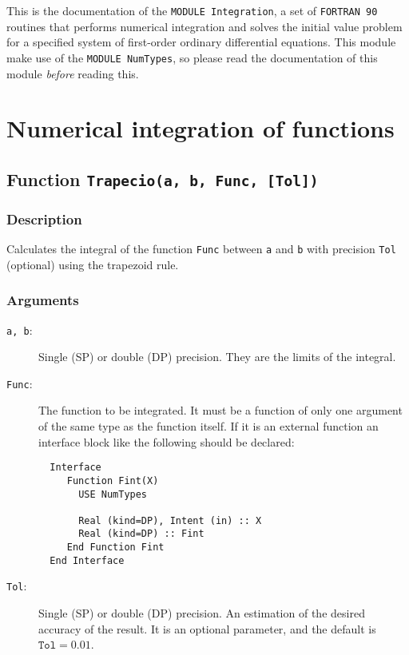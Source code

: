This is the documentation of the \texttt{MODULE Integration}, a set
of \texttt{FORTRAN 90} routines that performs numerical integration
and solves the initial value problem for a specified system  of
first-order  ordinary  differential equations. This module make use
of the \texttt{MODULE NumTypes}, so please read the documentation of
this module \emph{before} reading this.

\section{Numerical integration of functions}


\subsection{Function \texttt{Trapecio(a, b, Func, [Tol])}}

\subsubsection{Description}

Calculates the integral of the function \texttt{Func} between
\texttt{a} and \texttt{b} with precision \texttt{Tol} (optional) using
the trapezoid rule.


\subsubsection{Arguments}

\begin{description}
\item[\texttt{a, b}:] Single (SP) or double (DP) precision. They are
  the limits of the integral.
\item[\texttt{Func}:] The function to be integrated. It must be a
  function of only one argument of the same type as the function
  itself. If it is an
  external function an interface block like the following should be
  declared: 
\begin{verbatim}
  Interface 
     Function Fint(X)
       USE NumTypes

       Real (kind=DP), Intent (in) :: X
       Real (kind=DP) :: Fint
     End Function Fint
  End Interface
\end{verbatim}
\item[\texttt{Tol}:] Single (SP) or double (DP) precision. An
  estimation of the desired accuracy of the result. It is an optional
  parameter, and the default is $\mathtt{Tol} = 0.01$. 
\end{description}


